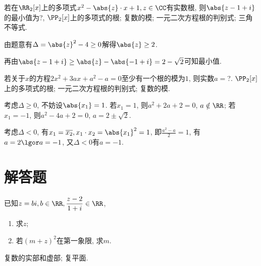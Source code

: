 \documentclass[8pt]{article}
\begin{document}
		\begin{easonbigproblem}
			若在\(\RR_2[x]\)上的多项式\(x^2 - \abs{z} \cdot x + 1, z\in \CC\)有实数根, 则\(\abs{z-1+i}\)的最小值为?,
			\subbigproblem
			 \(\PP_2[x]\)上的多项式的根; 复数的模; 一元二次方程根的判别式; 三角不等式.

			由题意有\(\Delta = \abs{z}^2 - 4 \geq 0\)解得\(\abs{z} \geq 2\).

			再由\(\abs{z-1+i} \geq \abs{z} - \abs{-1+i} = 2 - \sqrt{2}\)可知最小值.
		\end{easonbigproblem}

		\begin{easonbigproblem}
			若关于\(x\)的方程\(2x^2 + 3ax + a^2 - a = 0\)至少有一个根的模为\(1\), 则实数\(a = \)?.
			\subbigproblem
			 \(\PP_2[x]\)上的多项式的根; 一元二次方程根的判别式; 复数的模.
		
			考虑\(\Delta \geq 0\), 不妨设\(\abs{x_1} = 1\). 若\(x_1 = 1\), 则\(a^2 + 2a + 2 = 0\), \(a \notin \RR\); 若\(x_1 = -1\), 则\(a^2 - 4a + 2 = 0\), \(a = 2 \pm \sqrt{2}\).

			考虑\(\Delta < 0\), 有\(x_1 = \overline{x_2}, x_1 \cdot x_2 = \abs{x_1}^2 = 1\), 即\(\displaystyle \frac{a^2 - a}{2} = 1\), 有\(a = 2 \lgor a = -1\), 又\(\Delta < 0\)有\(a = -1\).
		\end{easonbigproblem}

	\section{解答题}
		\begin{easonproblem}
			已知\(z = bi, b \in \RR, \displaystyle \frac{z-2}{1+i} \in \RR\),
			\begin{enumerate}[label = \calword{(\arabic*)}]
				\item 求\(z\);
    			\item 若\((m+z)^2\)在第一象限, 求\(m\).
			\end{enumerate}
			\subproblem
			 复数的实部和虚部; 复平面.
		\end{easonproblem}
\end{document}
